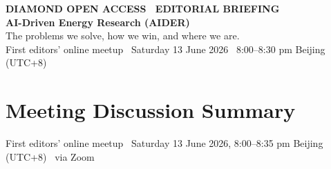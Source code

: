 \documentclass[11pt]{article}
\begin{document}
\begin{tcolorbox}[colback=darkbg, colframe=darkbg, arc=3pt, left=18pt, right=18pt, top=14pt, bottom=14pt]
  {\sffamily\footnotesize\color{accent}\bfseries DIAMOND OPEN ACCESS \textbullet\ EDITORIAL BRIEFING}\\[4pt]
  {\sffamily\LARGE\bfseries\color{white} AI-Driven Energy Research (AIDER)}\\[5pt]
  {\sffamily\small\color{white!75} The problems we solve, how we win, and where we are.}\\[8pt]
  {\sffamily\footnotesize\color{white!60} First editors' online meetup \textbullet\ Saturday 13 June 2026 \textbullet\ 8:00--8:30 pm Beijing (UTC+8)}
\end{tcolorbox}

\vspace{4pt}

\section*{Meeting Discussion Summary}
\vspace{-3pt}
{\footnotesize\sffamily\color{ink3}First editors' online meetup \textbullet\ Saturday 13 June 2026, 8:00--8:35 pm Beijing (UTC+8) \textbullet\ via Zoom}
\end{document}
